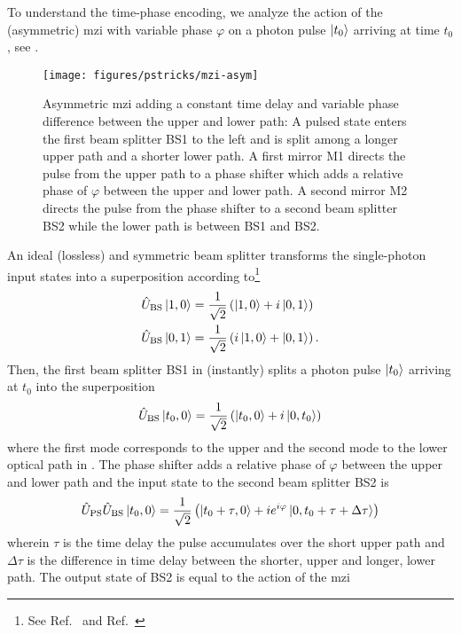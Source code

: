 To understand the time-phase encoding, we analyze the action of the (asymmetric) \gls{mzi} with variable phase $\varphi$ on a photon pulse $\ket{t_0}$ arriving at time $t_0$, see .
\begin{figure}[htb]
    \centering
    \texttt{[image: figures/pstricks/mzi-asym]}
     \caption{Asymmetric \gls{mzi} adding a constant time delay and variable phase difference between the upper and lower path: A pulsed state enters the first beam splitter BS1 to the left and is split among a longer upper path and a shorter lower path. A first mirror M1 directs the pulse from the upper path to a phase shifter which adds a relative phase of $\varphi$ between the upper and lower path. A second mirror M2 directs the pulse from the phase shifter to a second beam splitter BS2 while the lower path is between BS1 and BS2.}\label{fig:mzi_asym}
\end{figure}
An ideal (lossless) and symmetric beam splitter transforms the single-photon input states into a superposition according to\footnote{See Ref.~\cite[p.~137]{Haroche2006} and Ref.~\cite[p.~143]{Gerry2005}}
\begin{align}
	\hat{U}_\text{BS}
	\ket{1,0}
	&=
	\frac{1}{\sqrt{2}}
	\left(\ket{1,0}+i\ket{0,1}\right)
	\\
	\hat{U}_\text{BS}
	\ket{0,1}
	&=
	\frac{1}{\sqrt{2}}
	\left(i\ket{1,0}+\ket{0,1}\right)
	.
\end{align}
Then, the first beam splitter BS1 in  (instantly) splits a photon pulse $\ket{t_0}$ arriving at $t_0$ into the superposition
\begin{equation}
	\hat{U}_\text{BS}
	\ket{t_0,0}
	=
	\frac{1}{\sqrt{2}}
	\left(\ket{t_0,0}+i\ket{0,t_0}\right)
\end{equation}
where the first mode corresponds to the upper and the second mode to the lower optical path in .
The phase shifter adds a relative phase of $\varphi$ between the upper and lower path and the input state to the second beam splitter BS2 is
\begin{equation}
	\hat{U}_\text{PS}
	\hat{U}_\text{BS}
	\ket{t_0,0}
	=
	\frac{1}{\sqrt{2}}
	\left(
		\ket{t_0+\tau,0}
		+
		ie^{i\varphi}
		\ket{0,t_0+\tau+\Delta\tau}
	\right)
\end{equation}
wherein $\tau$ is the time delay the pulse accumulates over the short upper path and $\Delta\tau$ is the difference in time delay between the shorter, upper and longer, lower path.
The output state of BS2 is equal to the action of the \gls{mzi}
